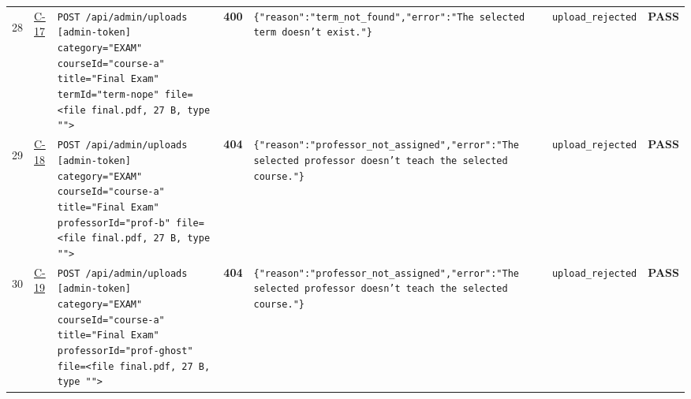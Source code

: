 \documentclass[10pt,a4paper]{article}
\begin{document}
\begin{landscape}
\begin{longtable}{@{}P{0.6cm}P{0.9cm}P{8.5cm}P{1.0cm}P{6.2cm}P{4.2cm}P{1.1cm}@{}}
\hypertarget{call28}{28} & \hyperlink{test-C-17}{C-17} & \texttt{POST /\allowbreak{}api/\allowbreak{}admin/\allowbreak{}uploads [admin-\allowbreak{}token] category=\allowbreak{}"\allowbreak{}EXAM"\allowbreak{} courseId=\allowbreak{}"\allowbreak{}course-\allowbreak{}a"\allowbreak{} title=\allowbreak{}"\allowbreak{}Final Exam"\allowbreak{} termId=\allowbreak{}"\allowbreak{}term-\allowbreak{}nope"\allowbreak{} file=\allowbreak{}<file final.\allowbreak{}pdf,\allowbreak{} 27 B,\allowbreak{} type "\allowbreak{}"\allowbreak{}>} & \textcolor{warnamber}{\textbf{400}} & \texttt{\{"\allowbreak{}reason"\allowbreak{}:\allowbreak{}"\allowbreak{}term\_\allowbreak{}not\_\allowbreak{}found"\allowbreak{},\allowbreak{}"\allowbreak{}error"\allowbreak{}:\allowbreak{}"\allowbreak{}The selected term doesn't exist.\allowbreak{}"\allowbreak{}\}} & \texttt{upload\_\allowbreak{}rejected} & \textcolor{passgreen}{\textbf{PASS}} \\
\hypertarget{call29}{29} & \hyperlink{test-C-18}{C-18} & \texttt{POST /\allowbreak{}api/\allowbreak{}admin/\allowbreak{}uploads [admin-\allowbreak{}token] category=\allowbreak{}"\allowbreak{}EXAM"\allowbreak{} courseId=\allowbreak{}"\allowbreak{}course-\allowbreak{}a"\allowbreak{} title=\allowbreak{}"\allowbreak{}Final Exam"\allowbreak{} professorId=\allowbreak{}"\allowbreak{}prof-\allowbreak{}b"\allowbreak{} file=\allowbreak{}<file final.\allowbreak{}pdf,\allowbreak{} 27 B,\allowbreak{} type "\allowbreak{}"\allowbreak{}>} & \textcolor{warnamber}{\textbf{404}} & \texttt{\{"\allowbreak{}reason"\allowbreak{}:\allowbreak{}"\allowbreak{}professor\_\allowbreak{}not\_\allowbreak{}assigned"\allowbreak{},\allowbreak{}"\allowbreak{}error"\allowbreak{}:\allowbreak{}"\allowbreak{}The selected professor doesn't teach the selected course.\allowbreak{}"\allowbreak{}\}} & \texttt{upload\_\allowbreak{}rejected} & \textcolor{passgreen}{\textbf{PASS}} \\
\hypertarget{call30}{30} & \hyperlink{test-C-19}{C-19} & \texttt{POST /\allowbreak{}api/\allowbreak{}admin/\allowbreak{}uploads [admin-\allowbreak{}token] category=\allowbreak{}"\allowbreak{}EXAM"\allowbreak{} courseId=\allowbreak{}"\allowbreak{}course-\allowbreak{}a"\allowbreak{} title=\allowbreak{}"\allowbreak{}Final Exam"\allowbreak{} professorId=\allowbreak{}"\allowbreak{}prof-\allowbreak{}ghost"\allowbreak{} file=\allowbreak{}<file final.\allowbreak{}pdf,\allowbreak{} 27 B,\allowbreak{} type "\allowbreak{}"\allowbreak{}>} & \textcolor{warnamber}{\textbf{404}} & \texttt{\{"\allowbreak{}reason"\allowbreak{}:\allowbreak{}"\allowbreak{}professor\_\allowbreak{}not\_\allowbreak{}assigned"\allowbreak{},\allowbreak{}"\allowbreak{}error"\allowbreak{}:\allowbreak{}"\allowbreak{}The selected professor doesn't teach the selected course.\allowbreak{}"\allowbreak{}\}} & \texttt{upload\_\allowbreak{}rejected} & \textcolor{passgreen}{\textbf{PASS}} \\

\end{longtable}
\end{landscape}
\end{document}
